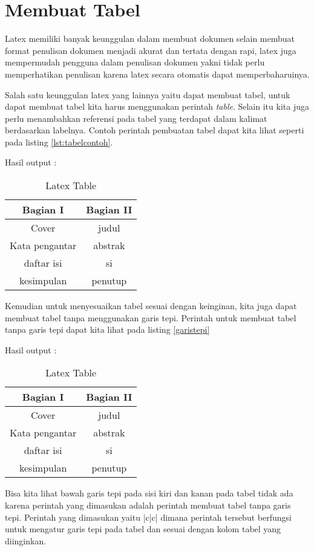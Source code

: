 \section{Membuat Tabel}
Latex memiliki banyak keunggulan dalam membuat dokumen selain membuat format penulisan dokumen menjadi akurat dan tertata dengan rapi, latex juga mempermudah pengguna dalam penulisan dokumen yakni tidak perlu memperhatikan penulisan karena latex secara otomatis dapat memperbaharuinya.

Salah satu keunggulan latex yang lainnya yaitu dapat membuat tabel, untuk dapat membuat tabel kita harus menggunakan perintah \textit{table}. Selain itu kita juga perlu menambahkan referensi pada tabel yang terdapat dalam kalimat berdasarkan labelnya. Contoh perintah pembuatan tabel dapat kita lihat seperti pada listing \ref{lst:tabelcontoh}.



Hasil output :

\begin{table}[h]
\caption{Latex Table}
\centering
\begin{tabular}{|c|c|}
\hline
\textbf{Bagian I}&\textbf{Bagian II}\\
\hline
Cover&judul\\
\hline
Kata pengantar&abstrak\\
\hline
daftar isi&si\\
\hline
kesimpulan&penutup\\
\hline
\end{tabular}
\label{table:permisalan}
\end{table}

Kemudian untuk menyesuaikan tabel sesuai dengan keinginan, kita juga dapat membuat tabel tanpa menggunakan garis tepi. Perintah untuk membuat tabel tanpa garis tepi dapat kita lihat pada listing \ref{garistepi}


Hasil output :

\begin{table}[h]
\caption{Latex Table}
\centering
\begin{tabular}{c|c}
\hline
\textbf{Bagian I}&\textbf{Bagian II}\\
\hline
Cover&judul\\
\hline
Kata pengantar&abstrak\\
\hline
daftar isi&si\\
\hline
kesimpulan&penutup\\
\hline
\end{tabular}
\label{table:permisalan}
\end{table}

Bisa kita lihat bawah garis tepi pada sisi kiri dan kanan pada tabel tidak ada karena perintah yang dimasukan adalah perintah membuat tabel tanpa garis tepi. Perintah yang dimasukan yaitu |c|c| dimana perintah tersebut berfungsi untuk mengatur garis tepi pada tabel dan sesuai dengan kolom tabel yang diinginkan.